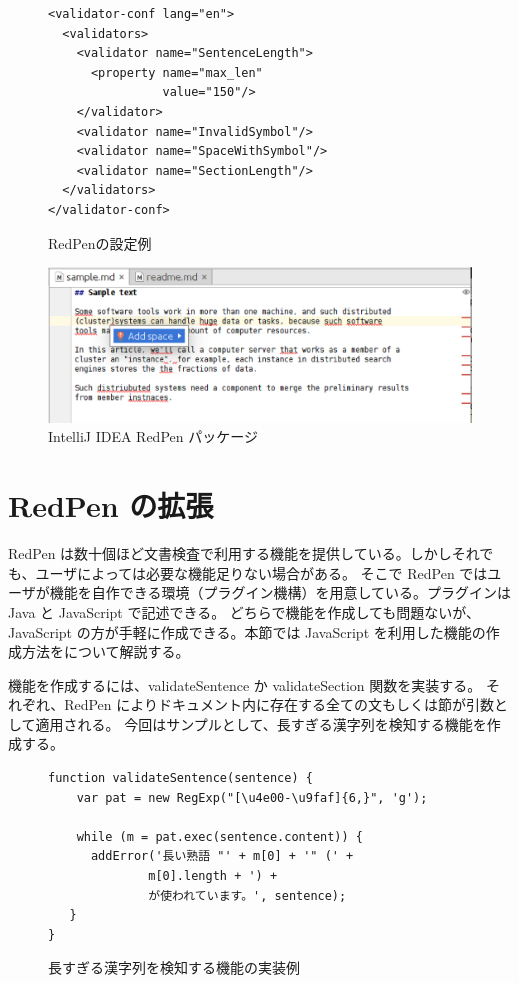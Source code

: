 \begin{figure}
  \scriptsize
  \small
  \begin{verbatim}
<validator-conf lang="en">
  <validators>
    <validator name="SentenceLength">
      <property name="max_len"
                value="150"/>
    </validator>
    <validator name="InvalidSymbol"/>
    <validator name="SpaceWithSymbol"/>
    <validator name="SectionLength"/>
  </validators>
</validator-conf>
  \end{verbatim}
  \normalsize
  \caption{RedPenの設定例}
  \label{fig:conf}
\end{figure}

\begin{figure}[t]
  \begin{center}
    \includegraphics[width=15cm]{figs/quick-fix.eps}
    \caption{IntelliJ IDEA RedPen パッケージ}
    \label{fig:intellij-idea}
  \end{center}
\end{figure}

\section{RedPen の拡張}
\label{sec:extension}
RedPen は数十個ほど文書検査で利用する機能を提供している。しかしそれでも、ユーザによっては必要な機能足りない場合がある。
そこで RedPen ではユーザが機能を自作できる環境（プラグイン機構）を用意している。プラグインは Java と JavaScript で記述できる。
どちらで機能を作成しても問題ないが、JavaScript の方が手軽に作成できる。本節では JavaScript を利用した機能の作成方法をについて解説する。

機能を作成するには、validateSentence か validateSection 関数を実装する。
それぞれ、RedPen によりドキュメント内に存在する全ての文もしくは節が引数として適用される。
今回はサンプルとして、長すぎる漢字列を検知する機能を作成する。

\begin{figure}
  \scriptsize
  \small
  \begin{verbatim}
function validateSentence(sentence) {
    var pat = new RegExp("[\u4e00-\u9faf]{6,}", 'g');

    while (m = pat.exec(sentence.content)) {
      addError('長い熟語 "' + m[0] + '" (' +
              m[0].length + ') +
              が使われています。', sentence);
   }
}
  \end{verbatim}
  \normalsize
  \caption{長すぎる漢字列を検知する機能の実装例}
  \label{fig:js-validator}
\end{figure}

